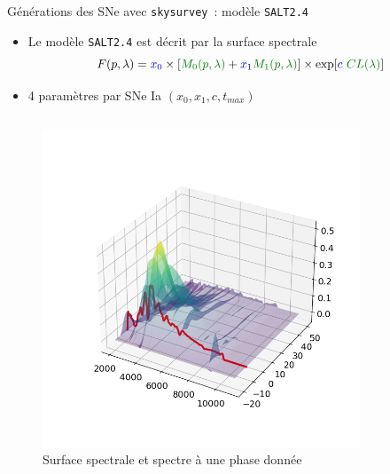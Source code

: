 \documentclass{beamer}
\def\skysurvey{\texttt{skysurvey}\xspace}
\def\saltd{\texttt{SALT2.4}\xspace}
\begin{document}
\begin{frame}{Générations des SNe avec \skysurvey~: modèle \saltd}
\begin{itemize}
	\item Le modèle \saltd est décrit par la surface spectrale
	\begin{equation}
	    F(p, \lambda) = \textcolor{blue}{x_0} \times \qty[\textcolor{deepgreen}{M_0(p, \lambda)} + \textcolor{blue}{x_1} \textcolor{deepgreen}{M_1(p, \lambda)}] \times \exp[\textcolor{blue}{c}\ \textcolor{deepgreen}{CL(\lambda)}]
	\end{equation}
	\item 4 paramètres par SNe Ia $(x_0, x_1, c, t_{max})$
\end{itemize}

\begin{columns}
	\begin{column}{.5\textwidth}
		\begin{figure}
			\centering
			\includegraphics[width=.9\textwidth, trim={1cm 1cm 1cm 2cm}, clip]{figures/model_w_spectra.png}
			\caption{Surface spectrale et spectre à une phase donnée}
		\end{figure}
	\end{column}
	\begin{column}{.5\textwidth}
		\begin{figure}
			\centering

\end{figure}
\end{column}
\end{columns}
\end{frame}
\end{document}
